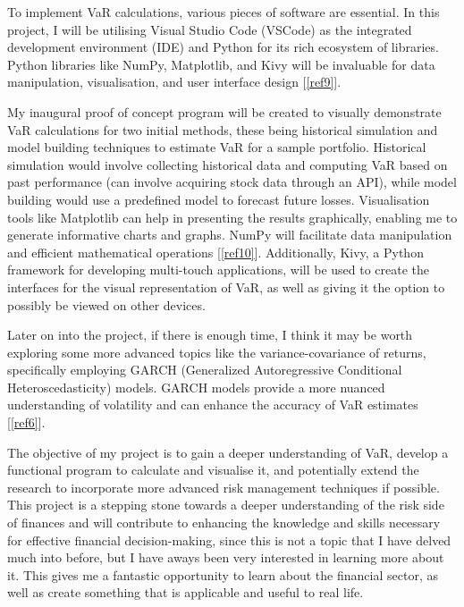 \documentclass{article}
\begin{document}
To implement VaR calculations, various pieces of software are essential. In this project, I will be utilising Visual Studio Code (VSCode) as the integrated development environment (IDE) and Python for its rich ecosystem of libraries. Python libraries like NumPy, Matplotlib, and Kivy will be invaluable for data manipulation, visualisation, and user interface design [\ref{ref9}].\\\vspace{0.3cm}

My inaugural proof of concept program will be created to visually demonstrate VaR calculations for  two initial methods, these being historical simulation and model building techniques to estimate VaR for a sample portfolio. Historical simulation would involve collecting historical data and computing VaR based on past performance (can involve acquiring stock data through an API), while model building would use a predefined model to forecast future losses. Visualisation tools like Matplotlib can help in presenting the results graphically, enabling me to generate informative charts and graphs. NumPy will facilitate data manipulation and efficient mathematical operations [\ref{ref10}]. Additionally, Kivy, a Python framework for developing multi-touch applications, will be used to create the interfaces for the visual representation of VaR, as well as giving it the option to possibly be viewed on other devices.\\\vspace{0.3cm}

Later on into the project, if there is enough time, I think it may be worth exploring some more advanced topics like the variance-covariance of returns, specifically employing GARCH (Generalized Autoregressive Conditional Heteroscedasticity) models. GARCH models provide a more nuanced understanding of volatility and can enhance the accuracy of VaR estimates [\ref{ref6}].\\\vspace{0.3cm}

The objective of my project is to gain a deeper understanding of VaR, develop a functional program to calculate and visualise it, and potentially extend the research to incorporate more advanced risk management techniques if possible. This project is a stepping stone towards a deeper understanding of the risk side of finances and will contribute to enhancing the knowledge and skills necessary for effective financial decision-making, since this is not a topic that I have delved much into before, but I have aways been very interested in learning more about it. This gives me a fantastic opportunity to learn about the financial sector, as well as create something that is applicable and useful to real life. \\
\end{document}
